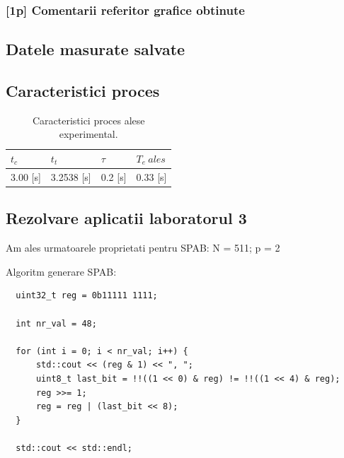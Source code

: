 \documentclass[12pt,english]{article}
\begin{document}
\subsubsection { [1p] Comentarii referitor grafice obtinute }
\subsection { Datele masurate salvate }
\subsection { Caracteristici proces }
\begin{table}[H]
  \centering
    \begin{tabular}{|l|l|l|l|}
      \hline
      $t_c$ & $t_t$ & $\tau$ & $T_e\ ales$ \\
      \hline
      3.00 [s] & 3.2538 [s] & 0.2 [s] & 0.33 [s] \\
      \hline
    \end{tabular}
    \caption{Caracteristici proces alese experimental.}
\end{table}

\subsection { Rezolvare aplicatii laboratorul 3 }
Am ales urmatoarele proprietati pentru SPAB:
N = 511; p = 2

\begin{center}
\end{center}

Algoritm generare SPAB:
\begin{lstlisting}
  uint32_t reg = 0b11111 1111; 

  int nr_val = 48; 

  for (int i = 0; i < nr_val; i++) { 
      std::cout << (reg & 1) << ", "; 
      uint8_t last_bit = !!((1 << 0) & reg) != !!((1 << 4) & reg); 
      reg >>= 1; 
      reg = reg | (last_bit << 8); 
  } 

  std::cout << std::endl;
\end{lstlisting}
\end{document}
